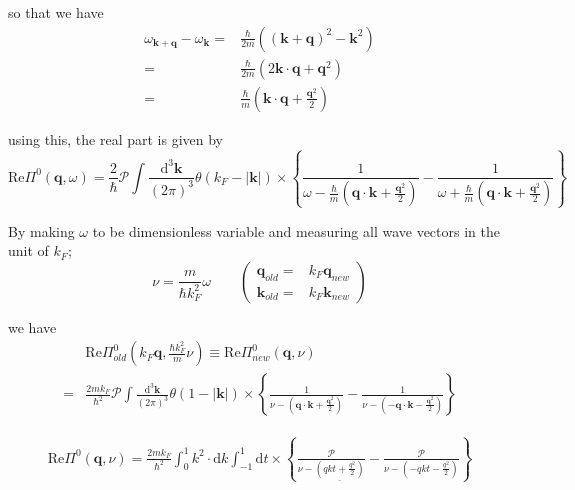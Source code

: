 so that we have
\begin{equation} \label{Eqs2.8.17} \begin{split}
\omega_{\mathbf{k}+\mathbf{q}} - \omega_{\mathbf{k}} =& \frac{\hbar}{2m}\left( (\mathbf{k}+\mathbf{q})^2-\mathbf{k}^2 \right)\\
=& \frac{\hbar}{2m}\left( 2 \mathbf{k} \cdot \mathbf{q} + \mathbf{q}^2 \right)\\
=& \frac{\hbar}{m} \left( \mathbf{k}\cdot \mathbf{q} + \frac{\mathbf{q}^2}{2} \right)
\end{split}\end{equation}

using this, the real part is given by
\[ \text{Re} \Pi^0(\mathbf{q},\omega) = \frac{2}{\hbar} \mathscr{P} \int \frac{\mathrm{d}^3 \mathbf{k}}{(2\pi)^3} \theta(k_F - |\mathbf{k}|) \times \left\{ \frac{1}{\omega-\frac{\hbar}{m}(\mathbf{q}\cdot\mathbf{k}+\frac{\mathbf{q}^2}{2})} - \frac{1}{\omega+\frac{\hbar}{m}(\mathbf{q}\cdot\mathbf{k}+\frac{\mathbf{q}^2}{2})} \right\}
\]

By making $\omega$ to be dimensionless variable and measuring all wave vectors in the unit of $k_F$;
\begin{equation} \label{Eqs2.8.18}
\nu = \frac{m}{\hbar k_F^2} \omega \qquad
\left( \begin{aligned} \mathbf{q}_{old} =& k_F \mathbf{q}_{new}\\
\mathbf{k}_{old} =& k_F \mathbf{k}_{new}  \end{aligned}\right)
\end{equation}

we have
\[ \begin{split} &\text{Re} \Pi^0_{old}(k_F\mathbf{q},\frac{\hbar k_F^2}{m}\nu) \equiv \text{Re} \Pi^0_{new}(\mathbf{q},\nu) \\
=& \frac{2 m k_F}{\hbar^2} \mathscr{P} \int \frac{\mathrm{d}^3 \mathbf{k}}{(2\pi)^3} \theta(1 - |\mathbf{k}|) \times \left\{ \frac{1}{\nu-(\mathbf{q}\cdot\mathbf{k} + \frac{\mathbf{q}^2}{2})} - \frac{1}{\nu-(-\mathbf{q}\cdot\mathbf{k}-\frac{\mathbf{q}^2}{2})} \right\}
\end{split}\]

\begin{equation} \label{Eqs2.8.19} \begin{split} \text{Re} \Pi^0(\mathbf{q},\nu)
= \frac{2 m k_F}{\hbar^2} \int_0^1 k^2 \cdot \mathrm{d} k \int_{-1}^{1} \mathrm{d} t \times \left\{ \frac{\mathscr{P}}{\nu-\underline{(q k t + \frac{q^2}{2})}} - \frac{\mathscr{P}}{\nu-(-q k t-\frac{q^2}{2})} \right\}
\end{split}\end{equation}


